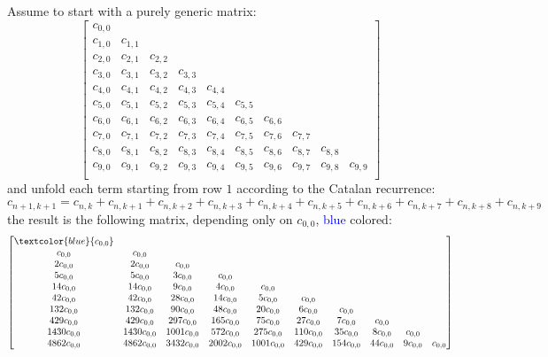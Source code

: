Assume to start with a purely generic matrix:
\begin{equation}
\left[\begin{matrix}
c_{0,0} &  &  &  &  &  &  &  &  &  \\
c_{1,0} & c_{1,1} &  &  &  &  &  &  &  &  \\
c_{2,0} & c_{2,1} & c_{2,2} &  &  &  &  &  &  &  \\
c_{3,0} & c_{3,1} & c_{3,2} & c_{3,3} &  &  &  &  &  &  \\
c_{4,0} & c_{4,1} & c_{4,2} & c_{4,3} & c_{4,4} &  &  &  &  &  \\
c_{5,0} & c_{5,1} & c_{5,2} & c_{5,3} & c_{5,4} & c_{5,5} &  &  &  &  \\
c_{6,0} & c_{6,1} & c_{6,2} & c_{6,3} & c_{6,4} & c_{6,5} & c_{6,6} &  &  &  \\
c_{7,0} & c_{7,1} & c_{7,2} & c_{7,3} & c_{7,4} & c_{7,5} & c_{7,6} & c_{7,7} &  &  \\
c_{8,0} & c_{8,1} & c_{8,2} & c_{8,3} & c_{8,4} & c_{8,5} & c_{8,6} & c_{8,7} & c_{8,8} &  \\
c_{9,0} & c_{9,1} & c_{9,2} & c_{9,3} & c_{9,4} & c_{9,5} & c_{9,6} & c_{9,7} & c_{9,8} & c_{9,9} \\
\end{matrix}\right]
\label{eq:purely:generic:catalan}
\end{equation}
and unfold each term starting from row $1$ according to the Catalan recurrence:
\begin{equation}
c_{n + 1,k + 1} = c_{n,k} + c_{n,k + 1} + c_{n,k + 2} + c_{n,k + 3} + c_{n,k + 4} + c_{n,k + 5} + c_{n,k + 6} + c_{n,k + 7} + c_{n,k + 8} + c_{n,k + 9}
\label{eq:catalan:rec}
\end{equation}
the result is the following matrix, depending only on $c_{0,0}$, \textcolor{blue}{blue} colored:
\begin{equation}
\left[\begin{matrix}
\textcolor{blue}{c_{0,0}} &  &  &  &  &  &  &  &  &  \\
c_{0,0} & c_{0,0} &  &  &  &  &  &  &  &  \\
2 c_{0,0} & 2 c_{0,0} & c_{0,0} &  &  &  &  &  &  &  \\
5 c_{0,0} & 5 c_{0,0} & 3 c_{0,0} & c_{0,0} &  &  &  &  &  &  \\
14 c_{0,0} & 14 c_{0,0} & 9 c_{0,0} & 4 c_{0,0} & c_{0,0} &  &  &  &  &  \\
42 c_{0,0} & 42 c_{0,0} & 28 c_{0,0} & 14 c_{0,0} & 5 c_{0,0} & c_{0,0} &  &  &  &  \\
132 c_{0,0} & 132 c_{0,0} & 90 c_{0,0} & 48 c_{0,0} & 20 c_{0,0} & 6 c_{0,0} & c_{0,0} &  &  &  \\
429 c_{0,0} & 429 c_{0,0} & 297 c_{0,0} & 165 c_{0,0} & 75 c_{0,0} & 27 c_{0,0} & 7 c_{0,0} & c_{0,0} &  &  \\
1430 c_{0,0} & 1430 c_{0,0} & 1001 c_{0,0} & 572 c_{0,0} & 275 c_{0,0} & 110 c_{0,0} & 35 c_{0,0} & 8 c_{0,0} & c_{0,0} &  \\
4862 c_{0,0} & 4862 c_{0,0} & 3432 c_{0,0} & 2002 c_{0,0} & 1001 c_{0,0} & 429 c_{0,0} & 154 c_{0,0} & 44 c_{0,0} & 9 c_{0,0} & c_{0,0} \\
\end{matrix}\right]
\label{eq:unfolded:catalan}
\end{equation}
